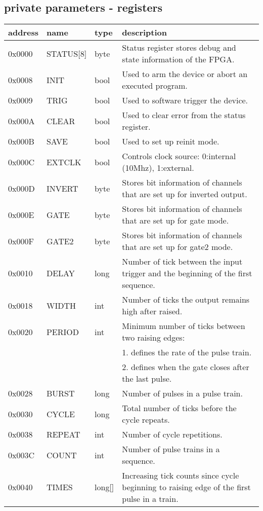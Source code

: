 \documentclass{article}
\begin{document}
\subsection*{private parameters - registers}
\begin{tabular}{llll}
address&name&type&description\\\hline
0x0000&STATUS[8]&byte&Status register stores debug and state information of the FPGA.\\
0x0008&INIT&bool&Used to arm the device or abort an executed program.\\
0x0009&TRIG&bool&Used to software trigger the device.\\
0x000A&CLEAR&bool&Used to clear error from the status register.\\
0x000B&SAVE&bool&Used to set up reinit mode.\\
0x000C&EXTCLK&bool&Controls clock source: 0:internal (10Mhz), 1:external.\\
0x000D&INVERT&byte&Stores bit information of channels that are set up for inverted output.\\
0x000E&GATE&byte&Stores bit information of channels that are set up for gate mode.\\
0x000F&GATE2&byte&Stores bit information of channels that are set up for gate2 mode.\\
0x0010&DELAY&long&Number of tick between the input trigger and the beginning of the first sequence.\\
0x0018&WIDTH&int&Number of ticks the output remains high after raised.\\
0x0020&PERIOD&int&Minimum number of ticks between two raising edges:\\
&&& 1. defines the rate of the pulse train.\\
&&& 2. defines when the gate closes after the last pulse.\\
0x0028&BURST&long&Number of pulses in a pulse train.\\
0x0030&CYCLE&long&Total number of ticks before the cycle repeats.\\
0x0038&REPEAT&int&Number of cycle repetitions.\\
0x003C&COUNT&int&Number of pulse trains in a sequence.\\
0x0040&TIMES&long[]&Increasing tick counts since cycle beginning to raising edge of the first pulse in a train.\\
\end{tabular}
\end{document}
